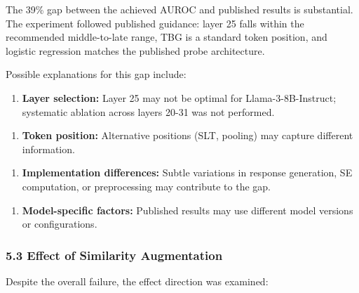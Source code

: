 The 39\% gap between the achieved AUROC and published results is substantial. The experiment followed published guidance: layer 25 falls within the recommended middle-to-late range, TBG is a standard token position, and logistic regression matches the published probe architecture.

Possible explanations for this gap include:

\begin{enumerate}
\item \textbf{Layer selection:} Layer 25 may not be optimal for Llama-3-8B-Instruct; systematic ablation across layers 20-31 was not performed.
\end{enumerate}

\begin{enumerate}
\item \textbf{Token position:} Alternative positions (SLT, pooling) may capture different information.
\end{enumerate}

\begin{enumerate}
\item \textbf{Implementation differences:} Subtle variations in response generation, SE computation, or preprocessing may contribute to the gap.
\end{enumerate}

\begin{enumerate}
\item \textbf{Model-specific factors:} Published results may use different model versions or configurations.
\end{enumerate}

\subsubsection{5.3 Effect of Similarity Augmentation}

Despite the overall failure, the effect direction was examined:

\begin{table}[htbp]
\centering
{}
\end{table}

